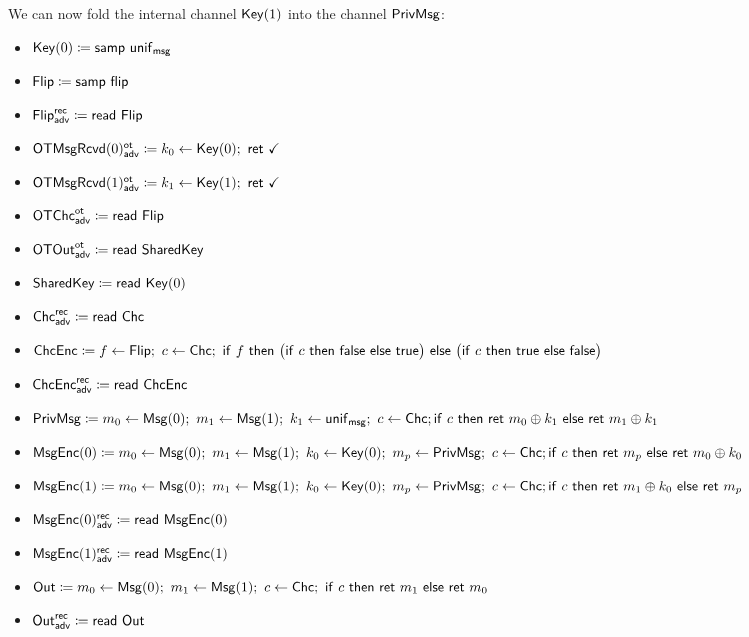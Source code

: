 \noindent We can now fold the internal channel $\mathsf{Key}(1)$ into the channel $\mathsf{PrivMsg}$:

\begin{itemize}
\item $\mathsf{Key}(0) \coloneqq \mathsf{samp} \ \mathsf{unif}_{\mathsf{msg}}$
\item $\mathsf{Flip} \coloneqq \mathsf{samp} \ \mathsf{flip}$
\item {\color{blue} $\mathsf{Flip}^{\mathsf{rec}}_{\mathsf{adv}} \coloneqq \mathsf{read} \ \mathsf{Flip}$}
\item {\color{blue} $\LeakOTMsgRcvd(0)^\ot_\adv \coloneqq k_0 \leftarrow \Key(0); \ \ret{\checkmark}$}
\item {\color{blue} $\LeakOTMsgRcvd(1)^\ot_\adv \coloneqq k_1 \leftarrow \Key(1); \ \ret{\checkmark}$}
\item {\color{blue} $\mathsf{OTChc}^{\mathsf{ot}}_{\mathsf{adv}} \coloneqq \mathsf{read} \ \mathsf{Flip}$}
\item {\color{blue} $\mathsf{OTOut}^{\mathsf{ot}}_{\mathsf{adv}} \coloneqq \mathsf{read} \ \mathsf{SharedKey}$}
\item $\mathsf{SharedKey} \coloneqq \mathsf{read} \ \mathsf{Key}(0)$
\item {\color{blue} $\mathsf{Chc}^{\mathsf{rec}}_{\mathsf{adv}} \coloneqq \mathsf{read} \ \mathsf{Chc}$}
\item $\ChcEnc \coloneqq f \leftarrow \Flip; \ c \leftarrow \Chc; \ \ifte{f}{\big(\ifte{c}{\false}{\true}\big)}{\big(\ifte{c}{\true}{\false}\big)}$
\item {\color{blue} $\mathsf{ChcEnc}^{\mathsf{rec}}_{\mathsf{adv}} \coloneqq \mathsf{read} \ \mathsf{ChcEnc}$}
\item {\color{red} $\mathsf{PrivMsg} \coloneqq m_0 \leftarrow \mathsf{Msg}(0); \ m_1 \leftarrow \mathsf{Msg}(1); \ k_1 \leftarrow \mathsf{unif}_{\mathsf{msg}}; \ c \leftarrow \mathsf{Chc}; \\ \mathsf{if} \ c \ \mathsf{then} \ \mathsf{ret} \ m_0 \oplus k_1 \ \mathsf{else} \ \mathsf{ret} \ m_1 \oplus k_1$}
\item $\mathsf{MsgEnc}(0) \coloneqq m_0 \leftarrow \mathsf{Msg}(0); \ m_1 \leftarrow \mathsf{Msg}(1); \ k_0 \leftarrow \mathsf{Key}(0); \ m_p \leftarrow \mathsf{PrivMsg}; \ c \leftarrow \mathsf{Chc}; \\ \mathsf{if} \ c \ \mathsf{then} \ \mathsf{ret} \ m_p \ \mathsf{else} \ \mathsf{ret} \ m_0 \oplus k_0$
\item $\mathsf{MsgEnc}(1) \coloneqq m_0 \leftarrow \mathsf{Msg}(0); \ m_1 \leftarrow \mathsf{Msg}(1); \ k_0 \leftarrow \mathsf{Key}(0); \ m_p \leftarrow \mathsf{PrivMsg}; \ c \leftarrow \mathsf{Chc}; \\ \mathsf{if} \ c \ \mathsf{then} \ \mathsf{ret} \ m_1 \oplus k_0 \ \mathsf{else} \ \mathsf{ret} \ m_p$
\item {\color{blue} $\mathsf{MsgEnc}(0)^{\mathsf{rec}}_{\mathsf{adv}} \coloneqq \mathsf{read} \ \mathsf{MsgEnc}(0)$}
\item {\color{blue} $\mathsf{MsgEnc}(1)^{\mathsf{rec}}_{\mathsf{adv}} \coloneqq \mathsf{read} \ \mathsf{MsgEnc}(1)$}
\item $\Out \coloneqq m_0 \leftarrow \Msg(0); \ m_1 \leftarrow \Msg(1); \ c \leftarrow \Chc; \ \ifte{c}{\ret{m_1}}{\ret{m_0}}$
\item {\color{blue} $\mathsf{Out}^{\mathsf{rec}}_{\mathsf{adv}} \coloneqq \mathsf{read} \ \mathsf{Out}$}
\end{itemize}

